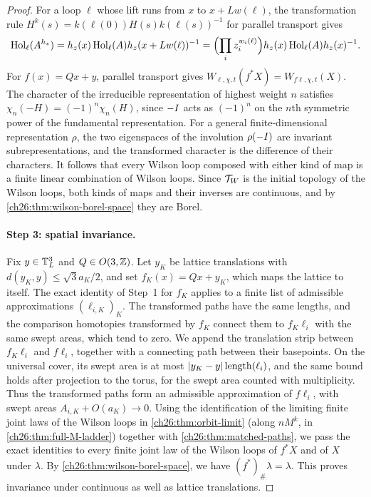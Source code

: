 \begin{proof}
For a loop $\ell$ whose lift runs from $x$ to $x+Lw(\ell)$, the transformation rule $H^k(s)=k(\ell(0))H(s)k(\ell(s))^{-1}$ for parallel transport gives
\begin{equation}\label{ch26:eq:continuum-center-holonomy}
 \operatorname{Hol}_\ell(A^{h_z})=h_z(x)\operatorname{Hol}_\ell(A)h_z(x+Lw(\ell))^{-1}=\Bigl(\prod_iz_i^{w_i(\ell)}\Bigr)h_z(x)\operatorname{Hol}_\ell(A)h_z(x)^{-1}.
\end{equation}
For $f(x)=Qx+y$, parallel transport gives $W_{\ell,\chi,t}(f^*X)=W_{f\ell,\chi,t}(X)$. The character of the irreducible representation of highest weight $n$ satisfies $\chi_n(-H)=(-1)^n\chi_n(H)$, since $-I$ acts as $(-1)^n$ on the $n$th symmetric power of the fundamental representation. For a general finite-dimensional representation $\rho$, the two eigenspaces of the involution $\rho(-I)$ are invariant subrepresentations, and the transformed character is the difference of their characters. It follows that every Wilson loop composed with either kind of map is a finite linear combination of Wilson loops. Since $\mathcal T_W$ is the initial topology of the Wilson loops, both kinds of maps and their inverses are continuous, and by \cref{ch26:thm:wilson-borel-space} they are Borel.

\paragraph{Step 3: spatial invariance.}
Fix $y\in\mathbb T_L^3$ and $Q\in O(3,\mathbb Z)$. Let $y_K$ be lattice translations with $d(y_K,y)\le\sqrt3a_K/2$, and set $f_K(x)=Qx+y_K$, which maps the lattice to itself. The exact identity of Step~1 for $f_K$ applies to a finite list of admissible approximations $(\ell_{i,K})_K$. The transformed paths have the same lengths, and the comparison homotopies transformed by $f_K$ connect them to $f_K\ell_i$ with the same swept areas, which tend to zero. We append the translation strip between $f_K\ell_i$ and $f\ell_i$, together with a connecting path between their basepoints. On the universal cover, its swept area is at most $\lvert y_K-y\rvert\operatorname{length}(\ell_i)$, and the same bound holds after projection to the torus, for the swept area counted with multiplicity. Thus the transformed paths form an admissible approximation of $f\ell_i$, with swept areas $A_{i,K}+O(a_K)\to0$. Using the identification of the limiting finite joint laws of the Wilson loops in \cref{ch26:thm:orbit-limit} (along $nM^k$, in \cref{ch26:thm:full-M-ladder}) together with \cref{ch26:thm:matched-paths}, we pass the exact identities to every finite joint law of the Wilson loops of $f^*X$ and of $X$ under $\lambda$. By \cref{ch26:thm:wilson-borel-space}, we have $(f^*)_\#\lambda=\lambda$. This proves invariance under continuous as well as lattice translations.


\end{proof}
